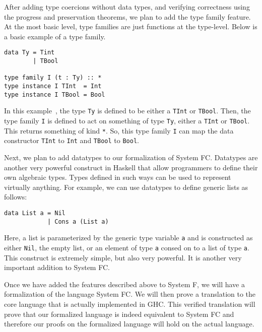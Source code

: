 \documentclass{sig-alternate}
\begin{document}
After adding type coercions without data types, and verifying correctness using the progress and preservation theorems, we plan to add the type family feature. At the most basic level, type families are just functions at the type-level. Below is a basic example of a type family.
\begin{verbatim}
data Ty = Tint
        | TBool

type family I (t : Ty) :: *
type instance I TInt  = Int
type instance I TBool = Bool
\end{verbatim}
In this example~\cite{DBLP:conf/icfp/WeirichHE13}, the type \texttt{Ty} is defined to be either a \texttt{TInt} or \texttt{TBool}. Then, the type family \texttt{I} is defined to act on something of type \texttt{Ty}, either a \texttt{TInt} or \texttt{TBool}. This returns something of kind \texttt{*}. So, this type family \texttt{I} can map the data constructor \texttt{TInt} to \texttt{Int} and \texttt{TBool} to \texttt{Bool}.

Next, we plan to add datatypes to our formalization of System FC.  Datatypes are another very powerful construct in Haskell that allow programmers to define their own algebraic types.  Types defined in such ways can be used to represent virtually anything.  For example, we can use datatypes to define generic lists as follows:
\begin{verbatim}
data List a = Nil
            | Cons a (List a)
\end{verbatim}
Here, a list is parameterized by the generic type variable \texttt{a} and is constructed as either \texttt{Nil}, the empty list, or an element of type \texttt{a} consed on to a list of type \texttt{a}.  This construct is extremely simple, but also very powerful.  It is another very important addition to System FC.

Once we have added the features described above to System F, we will have a formalization of the language System FC.  We will then prove a translation to the core language that is actually implemented in GHC.  This verified translation will prove that our formalized language is indeed equivalent to System FC and therefore our proofs on the formalized language will hold on the actual language.
\end{document}
